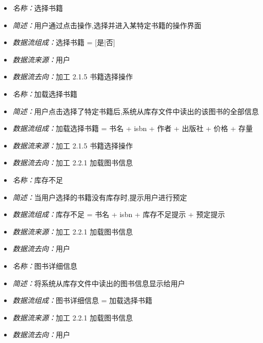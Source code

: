 \documentclass{article}
\begin{document}
\begin{CJK*}{UTF8}{gbsn}
\vspace{-1mm}

\begin{itemize}
	\item \textit{名称：}选择书籍
	\item \textit{简述：}用户通过点击操作,选择并进入某特定书籍的操作界面
	\item \textit{数据流组成：}选择书籍 = [是|否]
	\item \textit{数据流来源：}用户
	\item \textit{数据流去向：}加工 2.1.5 书籍选择操作
\end{itemize}

\vspace{-1mm}

\begin{itemize}
	\item \textit{名称：}加载选择书籍
	\item \textit{简述：}用户点击选择了特定书籍后,系统从库存文件中读出的该图书的全部信息
	\item \textit{数据流组成：}加载选择书籍 = 书名 + isbn + 作者 + 出版社 + 价格 + 存量
	\item \textit{数据流来源：}加工 2.1.5 书籍选择操作
	\item \textit{数据流去向：}加工 2.2.1 加载图书信息
\end{itemize}

\vspace{-1mm}

\begin{itemize}
	\item \textit{名称：}库存不足
	\item \textit{简述：}当用户选择的书籍没有库存时,提示用户进行预定
	\item \textit{数据流组成：}库存不足 = 书名 + isbn + 库存不足提示 + 预定提示
	\item \textit{数据流来源：}加工 2.2.1 加载图书信息
	\item \textit{数据流去向：}用户
\end{itemize}

\vspace{-1mm}

\begin{itemize}
	\item \textit{名称：}图书详细信息
	\item \textit{简述：}将系统从库存文件中读出的图书信息显示给用户
	\item \textit{数据流组成：}图书详细信息 = 加载选择书籍
	\item \textit{数据流来源：}加工 2.2.1 加载图书信息
	\item \textit{数据流去向：}用户
\end{itemize}


\end{CJK*}
\end{document}
